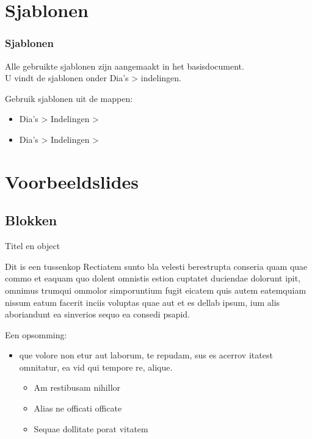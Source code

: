 \documentclass[showdate=true, slidenumbers=slide]{beamerruhuisstijl169}
\begin{document}
\section{Sjablonen}
\begin{frame}
    \frametitle{Sjablonen}

    \begin{block}{}
        Alle gebruikte sjablonen zijn aangemaakt in het basisdocument. \\
        U vindt de sjablonen onder Dia's > indelingen.
    \end{block}

    \begin{block}{}
        Gebruik sjablonen uit de mappen:
        \begin{itemize}
            \item Dia's > Indelingen > 
            \item Dia's > Indelingen > 
        \end{itemize}
    \end{block}


\end{frame}


\section{Voorbeeldslides}

\subsection{Blokken}
\begin{frame}{Titel en object}
    \begin{block}{Dit is een tussenkop}
        Rectiatem sunto bla velesti berestrupta conseria quam quae commo et eaquam quo dolent omnistis estion cuptatet duciendae dolorunt ipit, omnimus trumqui ommolor simporuntium fugit eicatem quis autem eatemquiam nissum eatum facerit inciis voluptas quae aut et es dellab ipsum, ium alis aboriandunt ea sinverios sequo ea consedi psapid.
    \end{block}

    \begin{block}{}
        Een opsomming:
        \begin{itemize}
            \item que volore non etur aut laborum, te repudam, sus es acerrov itatest omnitatur, ea vid qui tempore re, alique.
            \begin{itemize}
                \item Am restibusam nihillor
                \item Alias ne officati officate
                \item Sequae dollitate porat vitatem
            \end{itemize}
        \end{itemize}
    \end{block}
\end{frame}
\end{document}
